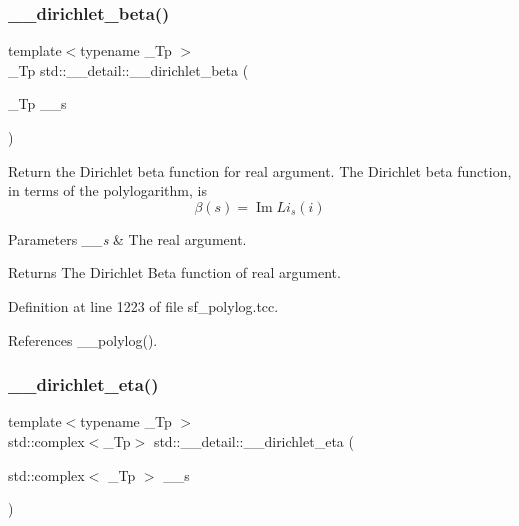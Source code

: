 \mbox{\label{namespacestd_1_1____detail_a2e4243f8d092d48e16fc45ba0c4e9489}} 
\subsubsection{\texorpdfstring{\+\_\+\+\_\+dirichlet\+\_\+beta()}{\_\_dirichlet\_beta()}\hspace{0.1cm}{\footnotesize\ttfamily [2/2]}}
{\footnotesize\ttfamily template$<$typename \+\_\+\+Tp $>$ \\
\+\_\+\+Tp std\+::\+\_\+\+\_\+detail\+::\+\_\+\+\_\+dirichlet\+\_\+beta (\begin{DoxyParamCaption}\item[{\+\_\+\+Tp}]{\+\_\+\+\_\+s }\end{DoxyParamCaption})}

Return the Dirichlet beta function for real argument. The Dirichlet beta function, in terms of the polylogarithm, is \[ \renewcommand\Re{\operatorname{Re}} \renewcommand\Im{\operatorname{Im}} \beta(s) = \Im{Li_s(i)} \]


\begin{DoxyParams}{Parameters}
{\em \+\_\+\+\_\+s} & The real argument. \\
\hline
\end{DoxyParams}
\begin{DoxyReturn}{Returns}
The Dirichlet Beta function of real argument. 
\end{DoxyReturn}


Definition at line 1223 of file sf\+\_\+polylog.\+tcc.



References \+\_\+\+\_\+polylog().

\mbox{\label{namespacestd_1_1____detail_a3d8d694bf430ca3959c9e6b00c332468}} 
\subsubsection{\texorpdfstring{\+\_\+\+\_\+dirichlet\+\_\+eta()}{\_\_dirichlet\_eta()}\hspace{0.1cm}{\footnotesize\ttfamily [1/2]}}
{\footnotesize\ttfamily template$<$typename \+\_\+\+Tp $>$ \\
std\+::complex$<$\+\_\+\+Tp$>$ std\+::\+\_\+\+\_\+detail\+::\+\_\+\+\_\+dirichlet\+\_\+eta (\begin{DoxyParamCaption}\item[{std\+::complex$<$ \+\_\+\+Tp $>$}]{\+\_\+\+\_\+s }\end{DoxyParamCaption})}

